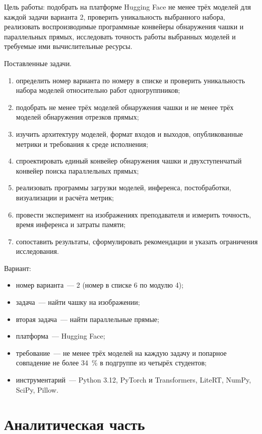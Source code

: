 \documentclass[a4paper,12pt]{extreport}
\begin{document}
Цель работы: подобрать на платформе Hugging Face не менее трёх моделей для каждой задачи варианта 2, проверить уникальность выбранного набора, реализовать воспроизводимые программные конвейеры обнаружения чашки и параллельных прямых, исследовать точность работы выбранных моделей и требуемые ими вычислительные ресурсы.

Поставленные задачи.
\begin{enumerate}
\item определить номер варианта по номеру в списке и проверить уникальность набора моделей относительно работ одногруппников;
\item подобрать не менее трёх моделей обнаружения чашки и не менее трёх моделей обнаружения отрезков прямых;
\item изучить архитектуру моделей, формат входов и выходов, опубликованные метрики и требования к среде исполнения;
\item спроектировать единый конвейер обнаружения чашки и двухступенчатый конвейер поиска параллельных прямых;
\item реализовать программы загрузки моделей, инференса, постобработки, визуализации и расчёта метрик;
\item провести эксперимент на изображениях преподавателя и измерить точность, время инференса и затраты памяти;
\item сопоставить результаты, сформулировать рекомендации и указать ограничения исследования.
\end{enumerate}

Вариант:
\begin{itemize}
\item номер варианта~--- 2 (номер в списке 6 по модулю 4);
\item задача~--- найти чашку на изображении;
\item вторая задача~--- найти параллельные прямые;
\item платформа~--- Hugging Face;
\item требование~--- не менее трёх моделей на каждую задачу и попарное совпадение не более 34~\% в подгруппе из четырёх студентов;
\item инструментарий~--- Python 3.12, PyTorch и Transformers, LiteRT, NumPy, SciPy, Pillow.
\end{itemize}

\chapter{Аналитическая часть}
\end{document}

